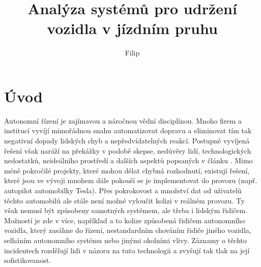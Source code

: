\documentclass[czech, bc, kky, he, iso690alph]{fasthesis}
\title{Analýza systémů pro udržení vozidla v jízdním pruhu}
\author{Filip}{Jašek}{}{}
\begin{document}
    \frontpages[tm] %
    \tableofcontents
    \makeatletter%
    \ifx\FASThesis@style\c@fullcolor%
    \else%
    \fi%
    \makeatother%
	\chapter{Úvod}
	    Autonomní řízení je zajímavou a náročnou vědní disciplínou. Mnoho firem a institucí vyvíjí mimořádnou snahu automatizovat dopravu a eliminovat tím tak negativní dopady lidských chyb a nepředvídatelných reakcí. Postupně vyvíjená řešení však naráží na překážky v podobě skepse, nedůvěry lidí, technologických nedostatků, neideálního prostředí a dalších aspektů popsaných v článku \cite{autopilot}. Mimo méně pokročilé projekty, které mohou dělat chybná rozhodnutí, existují řešení, které jsou ve vývoji mnohem dále pokouší se je implementovat do provozu (např. autopilot automobilky Tesla). Přes pokrokovost a množství dat od uživatelů těchto automobilů ale stále není možné vyloučit kolizi v reálném provozu. Ty však nemusí být způsobeny samotných systémem, ale třeba i lidským řidičem. Možností je zde v více, například a to kolize způsobená řidičem autonomního vozidla, který zasáhne do řízení, nestandardním chováním řidiče jiného vozidla, selháním autonomního systému nebo jinými okolními vlivy. Záznamy o těchto incidentech rozdělují lidi v názoru na tuto technologii a zvyšují tak tlak na její sofistikovanost.\\
\end{document}
